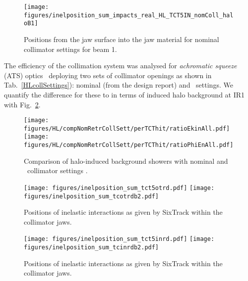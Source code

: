 \begin{figure}[!htb]
  \centering
  \texttt{[image: figures/inelposition\_sum\_impacts\_real\_HL\_TCT5IN\_nomColl\_haloB1]}
  \caption{Positions from the jaw surface into the jaw material for nominal collimator settings for beam 1.
  \label{fig:inel_nomColl}}
\end{figure}

The efficiency of the collimation system was analysed for \textit{achromatic squeeze} (ATS) optics~\cite{ATSref} deploying two sets of collimator openings as shown in Tab.~\ref{HLcollSettings}): nominal (from the design report) and \twosigmaret~settings. We quantify the difference for these to in terms of induced halo background at IR1 with Fig.~\ref{fig:compNomRetrSett}.

\begin{figure}
\begin{center}
\texttt{[image: figures/HL/compNomRetrCollSett/perTCThit/ratioEkinAll.pdf]}
\texttt{[image: figures/HL/compNomRetrCollSett/perTCThit/ratioPhiEnAll.pdf]}
\end{center}
\vspace{-0.6cm}
 \caption{Comparison of halo-induced background showers with nominal and \twosigmaret~collimator settings .
  \label{fig:compNomRetrSett}}
\end{figure}


\begin{figure}%
\begin{center}
\texttt{[image: figures/inelposition\_sum\_tct5otrd.pdf]}
\texttt{[image: figures/inelposition\_sum\_tcotrdb2.pdf]}

\end{center}
\vspace{-0.6cm}
 \caption{Positions of inelastic interactions as given by SixTrack within the collimator jaws.
  \label{inelHLtct5in}}
\end{figure}


\begin{figure}[!htb]
\begin{center}
\texttt{[image: figures/inelposition\_sum\_tct5inrd.pdf]}
\texttt{[image: figures/inelposition\_sum\_tcinrdb2.pdf]}
\end{center}
\vspace{-0.6cm}
 \caption{Positions of inelastic interactions as given by SixTrack within the collimator jaws.
  \label{inelHLtct5in}}
\end{figure}



